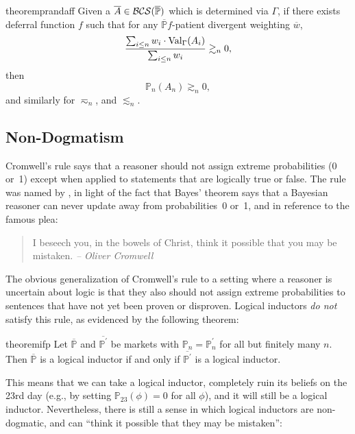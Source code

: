 \documentclass[authordate,onecolumn,noenvironments]{miri-tech-article}
\numberwithin{equation}{subsection}
\newcommand{\seq}[1]{{\overline{#1}}}
\newcommand{\nn}{n}
\newcommand{\fuz}{w}
\newcommand{\deff}{f}
\newcommand{\pgenable}{\ensuremath{\MP}\text{-generable}\xspace}
\newcommand{\rparenthetical}[1]{\hfill\upshape{{\small (#1)}}} %
\newcommand{\proofin}[1]{\rparenthetical{Proof in:~#1.}}
\newcommand{\aff}{A}
\newcommand{\BCS}[1][\MP]{\mathcal{B\-C\-S}(#1)} %
\newcommand{\BelState}{\mathbb{P}}
\newcommand{\pt}{\BelState}
\newcommand{\MP}{\seq{\pt}}
\newcommand{\Theory}{\Gamma}
\newcommand{\thmval}[1][\Theory]{\operatorname{Val}_{#1}\-} %
\begin{document}
\begin{restatable}{theorem}{prandaff}\label{thm:prandaff}
  Given a $\seq\aff \in \BCS$ which is determined via $\Theory$, if there exists deferral function $\deff$ such that for any \pgenable $\deff$-patient divergent weighting $\seq\fuz$,
  \[
    \frac{\sum_{i \leq \nn} \fuz_i  \cdot \thmval(\aff_i )}{\sum_{i \leq n} \fuz_i } \gtrsim_\nn 0,
  \]  
  then
  \[
    \pt_\nn(\aff_\nn ) \gtrsim_\nn 0,
  \]
  and similarly for $\eqsim_\nn$, and $\lesssim_\nn$.
  \proofin{\ref{app:prandaff}}
\end{restatable}






\subsection{Non-Dogmatism}\label{sec:conservatism}

Cromwell's rule says that a reasoner should not assign extreme probabilities (0 or~1) except when applied to statements that are logically true or false. The rule was named by \citet{Lindley:1991:MakingDecisions}, in light of the fact that Bayes' theorem says that a Bayesian reasoner can never update away from probabilities~0 or~1, and in reference to the famous plea:

\begin{quote}
  I beseech you, in the bowels of Christ, think it possible that you may be mistaken.
  \hfill\emph{-- Oliver Cromwell}
\end{quote}

\noindent The obvious generalization of Cromwell's rule to a setting where a reasoner is uncertain about logic is that they also should not assign extreme probabilities to sentences that have not yet been proven or disproven. Logical inductors \emph{do not} satisfy this rule, as evidenced by the following theorem:

\begin{restatable}{theorem}{ifp}\label{thm:ifp}
  Let $\MP$  and $\seq{\pt^\prime}$ be markets with $\pt_\nn = \pt^\prime_\nn$ for all but finitely many $\nn$. Then $\MP$ is a logical inductor if and only if $\seq{\pt^\prime}$ is a logical inductor.
  \proofin{\ref{app:ifp}}
\end{restatable}

\noindent This means that we can take a logical inductor, completely ruin its beliefs on the 23rd day (e.g., by setting $\pt_{23}(\phi)=0$ for all $\phi$), and it will still be a logical inductor. Nevertheless, there is still a sense in which logical inductors are non-dogmatic, and can ``think it possible that they may be mistaken'':
\end{document}
